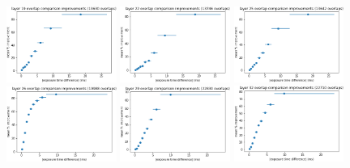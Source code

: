 \documentclass[letterpaper,11pt]{article}
\begin{document}
\begin{figure}[!ht]
\includegraphics[width=0.32\textwidth]{images/results/improvements_by_layer_vectra/layer_19_improvements_vectra}
\includegraphics[width=0.32\textwidth]{images/results/improvements_by_layer_vectra/layer_22_improvements_vectra}
\includegraphics[width=0.32\textwidth]{images/results/improvements_by_layer_vectra/layer_25_improvements_vectra}
\includegraphics[width=0.32\textwidth]{images/results/improvements_by_layer_vectra/layer_26_improvements_vectra}
\includegraphics[width=0.32\textwidth]{images/results/improvements_by_layer_vectra/layer_29_improvements_vectra}
\includegraphics[width=0.32\textwidth]{images/results/improvements_by_layer_vectra/layer_32_improvements_vectra}

\end{figure}
\end{document}
